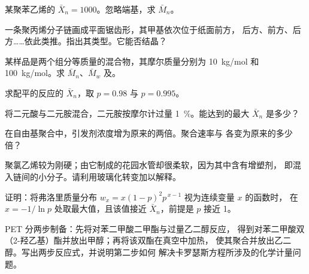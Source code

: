 \begin{exercise}[$\star$]\label{exo:b2:polymer-synthesis:3}
某聚苯乙烯的 $\bar X_n = 1000$。忽略端基，求 $\bar M_n$。
\end{exercise}

\begin{exercise}[$\star$]\label{exo:b2:polymer-synthesis:4}
一条聚丙烯分子链画成平面锯齿形，其甲基依次位于纸面前方，
后方、前方、后方……依此类推。指出其类型。它能否结晶？
\end{exercise}

\begin{exercise}[$\star\star$]\label{exo:b2:polymer-synthesis:5}
某样品是两个组分等质量的混合物，其摩尔质量分别为 \qty{10}{kg/mol} 和
\qty{100}{kg/mol}。求 $\bar M_n$、$\bar M_w$ 及。
\end{exercise}

\begin{exercise}[$\star\star$]\label{exo:b2:polymer-synthesis:6}
求配平的反应的 $\bar X_n$，取 $p = 0.98$ 与 $p = 0.995$。
\end{exercise}

\begin{exercise}[$\star\star$]\label{exo:b2:polymer-synthesis:7}
将二元酸与二元胺混合，二元胺按摩尔计过量 1~\%。能达到的最大
$\bar X_n$ 是多少？
\end{exercise}

\begin{exercise}[$\star\star$]\label{exo:b2:polymer-synthesis:8}
在自由基聚合中，引发剂浓度增为原来的两倍。聚合速率与
各变为原来的多少倍？
\end{exercise}

\begin{exercise}[$\star\star$]\label{exo:b2:polymer-synthesis:9}
聚氯乙烯较为刚硬；由它制成的花园水管却很柔软，因为其中含有增塑剂，
即混入链间的小分子。请利用玻璃化转变加以解释。
\end{exercise}

\begin{exercise}[$\star\star\star$]\label{exo:b2:polymer-synthesis:10}
证明：将弗洛里质量分布 $w_x = x(1-p)^2p^{\,x-1}$ 视为连续变量 $x$ 的函数时，
在 $x = -1/\ln p$ 处取最大值，且该值接近 $\bar X_n$，前提是 $p$ 接近 1。
\end{exercise}

\begin{exercise}[$\star\star\star$]\label{exo:b2:polymer-synthesis:11}
PET 分两步制备：先将对苯二甲酸二甲酯与过量乙二醇反应，
得到对苯二甲酸双（2-羟乙基）酯并放出甲醇；再将该双酯在真空中加热，
使其聚合并放出乙二醇。写出两步反应式，并说明第二步如何
解决卡罗瑟斯方程所涉及的化学计量问题。
\end{exercise}

